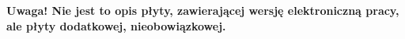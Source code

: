\documentclass[skorowidz,skroty]{dyplomWEZUT}
\begin{document}
\noindent\textbf{Uwaga! Nie jest to opis płyty, zawierającej wersję elektroniczną pracy, ale płyty dodatkowej, nieobowiązkowej.}


\printbibliography[heading=bibintoc]

\listoftables

\listoffigures

\listoflistings


\printindex
\end{document}
